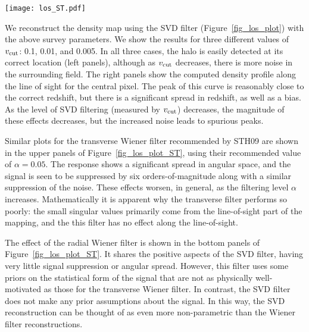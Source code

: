 \begin{figure*}[t]
 \centering
 \texttt{[image: los\_ST.pdf]}
 \caption{
   The effect of Wiener filtering on the same input as 
   Figure~\ref{fig_los_plot}. Here we have used both transverse 
   \textit{(top panels)}
   and radial \textit{(bottom panels)} Wiener filtering, both down-tuned 
   by $\alpha = 0.05$ (the value recommended by STH09).  
   The transverse Wiener filter suppresses the response by several 
   orders of magnitude; a closer view of the line-of-sight peak is shown 
   in the inset plot.  The radial Wiener filter gives similar angular 
   results to the SVD filter, but takes much longer to compute.
   \label{fig_los_plot_ST}} 
\end{figure*}

We reconstruct the density map using the SVD filter 
(Figure~\ref{fig_los_plot}) with the above survey parameters.  
We show the results for three different values of $v_{\rm cut}$: 
0.1, 0.01, and 0.005.  In all three cases, the halo is easily 
detected at its correct location (left panels),
although as $v_{\rm cut}$ decreases, there is more noise in the 
surrounding field.  The right panels show the computed density profile
along the line of sight for the central pixel. 
The peak of this curve is reasonably close to the correct redshift, 
but there is a significant spread in redshift, as well as a bias.
As the level of SVD filtering (measured by $v_{\rm cut}$) decreases, 
the magnitude of these effects decreases, but the increased noise 
leads to spurious peaks. 

Similar plots for the transverse Wiener filter recommended by STH09 are
shown in the upper panels of Figure~\ref{fig_los_plot_ST}, using their 
recommended value of $\alpha = 0.05$. 
The response shows a significant spread in angular space, and 
the signal is seen to be suppressed by six orders-of-magnitude along with
a similar suppression of the noise. 
These effects worsen, 
in general, as the filtering level $\alpha$ increases.
Mathematically it is apparent why the transverse filter performs so poorly:
the small singular values primarily come from the line-of-sight 
part of the mapping, and the this filter has no effect along the line-of-sight.

The effect of the radial Wiener filter is shown in the bottom panels of 
Figure~\ref{fig_los_plot_ST}.
It shares the positive aspects of the SVD filter, having very 
little signal suppression or angular spread.
However, this filter uses some priors on the statistical form of 
the signal that are not as physically well-motivated as those for the 
transverse Wiener filter.  In contrast, the SVD filter does not make 
any prior assumptions about the signal. In this way, the SVD reconstruction
can be thought of as even more non-parametric than the Wiener filter
reconstructions.

